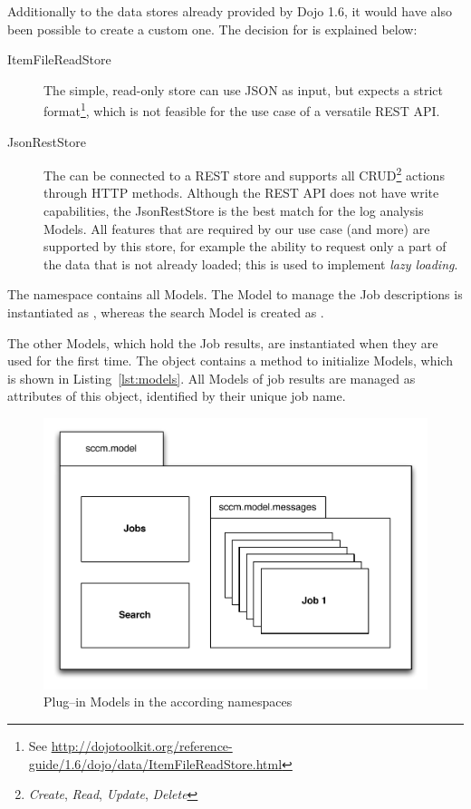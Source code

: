 Additionally to the data stores already provided by Dojo 1.6, it would have also been possible to create a custom one. The decision for  is explained below:
\begin{description}
	\item[ItemFileReadStore] The simple, read-only store  can use JSON as input, but expects a strict format\footnote{See \url{http://dojotoolkit.org/reference-guide/1.6/dojo/data/ItemFileReadStore.html}}, which is not feasible for the use case of a versatile REST API.
	\item[JsonRestStore] The  can be connected to a REST store and supports all CRUD\footnote{\emph{Create}, \emph{Read}, \emph{Update}, \emph{Delete}} actions through HTTP methods. Although the REST API does not have write capabilities, the JsonRestStore is the best match for the log analysis Models. All features that are required by our use case (and more) are supported by this store, for example the ability to request only a part of the data that is not already loaded; this is used to implement \emph{lazy loading}.
\end{description}

The namespace  contains all Models. The Model to manage the Job descriptions is instantiated as , whereas the search Model is created as .

The other Models, which hold the Job results, are instantiated when they are used for the first time. The object  contains a method to initialize Models, which is shown in Listing~\ref{lst:models}. All Models of job results are managed as attributes of this object, identified by their unique job name.

\begin{figure}[H]
	\centering
	\includegraphics[width=12cm]{images/stores.pdf}
	\caption{Plug--in Models in the according namespaces}
	\label{fig:stores}
\end{figure}

